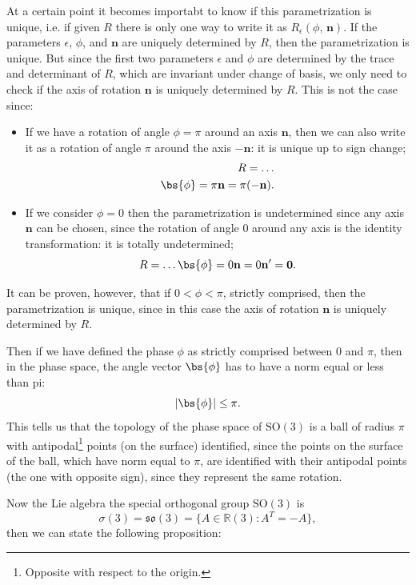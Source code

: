 At a certain point it becomes importabt to know if this parametrization is unique, i.e. if given \(R\) there is only one way to write it as \(R_{\epsilon}(\phi,\,\mathbf{n})\). If the parameters \(\epsilon\), \(\phi\), and \(\mathbf{n}\) are uniquely determined by \(R\), then the parametrization is unique. But since the first two parameters \(\epsilon\) and \(\phi\) are determined by the trace and determinant of \(R\), which are invariant under change of basis, we only need to check if the axis of rotation \(\mathbf{n}\) is uniquely determined by \(R\). This is not the case since:
\begin{itemize}
    \item If we have a rotation of angle \(\phi = \pi\) around an axis \(\mathbf{n}\), then we can also write it as a rotation of angle \(\pi\) around the axis \(-\mathbf{n}\): it is unique up to sign change;
          \[
              \begin{aligned}
                  R = \dots \\
                  \bs{\phi} = \pi \mathbf{n} = \pi (-\mathbf{n}).
              \end{aligned}
          \]
    \item If we consider \(\phi = 0\) then the parametrization is undetermined since any axis \(\mathbf{n}\) can be chosen, since the rotation of angle \(0\) around any axis is the identity transformation: it is totally undetermined;
          \[
              R = \dots \\
              \bs{\phi} = 0 \mathbf{n} = 0 \mathbf{n}' = \mathbf{0}.
          \]
\end{itemize}
It can be proven, however, that if \(0 < \phi < \pi\), strictly comprised, then the parametrization is unique, since in this case the axis of rotation \(\mathbf{n}\) is uniquely determined by \(R\).

Then if we have defined the phase \(\phi\) as strictly comprised between \(0\) and \(\pi\), then in the phase space, the angle vector \(\bs{\phi}\) has to have a norm equal or less than pi:
\[
    \vert \bs{\phi} \vert \leq \pi.
\]
This tells us that the topology of the phase space of \(\mathrm{SO}(3)\) is a ball of radius \(\pi\) with antipodal\footnote{Opposite with respect to the origin.} points (on the surface) identified, since the points on the surface of the ball, which have norm equal to \(\pi\), are identified with their antipodal points (the one with opposite sign), since they represent the same rotation.

Now the Lie algebra the special orthogonal group \(\mathrm{SO}(3)\) is
\[
    \sigma(3) = \mathfrak{so}(3) = \{ A \in \mathbb{R}(3) : A^T = -A \},
\]
then we can state the following proposition:

